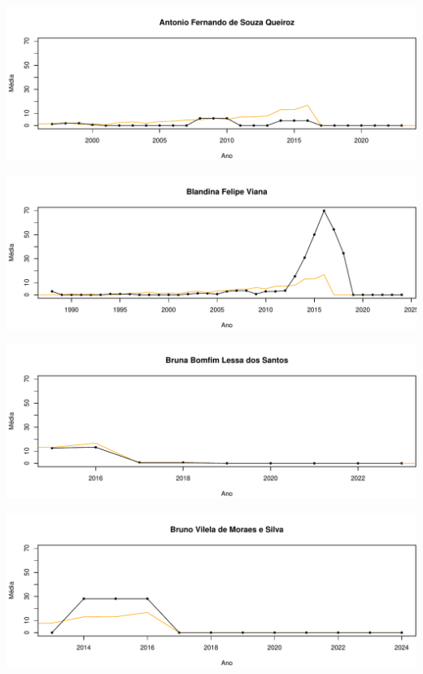 \documentclass[12pt,brazil]{article}\usepackage[]{graphicx}\usepackage[]{xcolor}
\makeatletter
\def\maxwidth{ %
  \ifdim\Gin@nat@width>\linewidth
    \linewidth
  \else
    \Gin@nat@width
  \fi
}
\makeatother
\begin{document}
\vspace{0.5cm}


{\centering \includegraphics[width=\maxwidth]{figure/mediamovel-7} 

}



\vspace{0.5cm}


{\centering \includegraphics[width=\maxwidth]{figure/mediamovel-8} 

}



\vspace{0.5cm}


{\centering \includegraphics[width=\maxwidth]{figure/mediamovel-9} 

}



\vspace{0.5cm}


{\centering \includegraphics[width=\maxwidth]{figure/mediamovel-10} 

}
\end{document}
